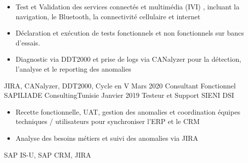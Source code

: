 \begin{experiences}
{                      \begin{itemize}
                        \item Test et Validation des services connectés et multimédia (IVI) , incluant la navigation, le Bluetooth, la connectivité cellulaire et internet                              
                        \item Déclaration et exécution de tests fonctionnels et non fonctionnels sur bancs d'essais.            
                        \item Diagnostic via DDT2000 et prise de logs via CANalyzer pour la détection, l'analyse et le reporting des anomalies                      
                      \end{itemize}
                    }
                    {JIRA, CANalyzer, DDT2000, Cycle en V}
  \emptySeparator
  \consultantexperience
  {Mars 2020}      {Consultant Fonctionnel SAP}{ILIADE Consulting}{Tunisie}
  {Janvier 2019 }       {Testeur et Support SI}{ENI DSI}
                    {
                    
                      \begin{itemize}
                        \item Recette fonctionnelle, UAT, gestion des anomalies et coordination équipes techniques / utilisateurs pour synchroniser l'ERP et le CRM                             
                        \item Analyse des besoins métiers et suivi des anomalies via JIRA        
                                           
                      \end{itemize}
                    }
                    {SAP IS-U, SAP CRM, JIRA} 
 
\end{experiences}

